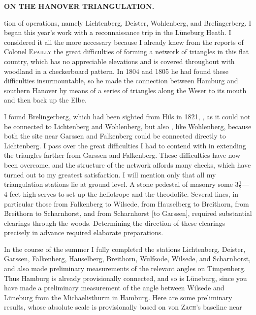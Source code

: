 \par\clearpage
\noindent{}\hfill{\small\textbf{ON THE HANOVER TRIANGULATION.}}\hfill\null\par\medskip
\noindent tion of operations, namely Lichtenberg, Deister, Wohlenberg, and Brelingerberg. I began this year's work with a reconnaissance trip in the Lüneburg Heath. I considered it all the more necessary because I already knew from the reports of Colonel \textsc{Epailly} the great difficulties of forming a network of triangles in this flat country, which has no appreciable elevations and is covered throughout with woodland in a checkerboard pattern. In 1804 and 1805 he had found these difficulties insurmountable, so he made the connection between Hamburg and southern Hanover by means of a series of triangles along the Weser to its mouth and then back up the Elbe.
\par\noindent\hspace*{\parindent}I found Brelingerberg, which had been sighted from Hils in 1821, , as it could not be connected to Lichtenberg and Wohlenberg, but also , like Wohlenberg, because both the site near Garssen and Falkenberg could be connected directly to Lichtenberg. I pass over the great difficulties I had to contend with in extending the triangles farther from Garssen and Falkenberg. These difficulties have now been overcome, and the structure of the network affords many checks, which have turned out to my greatest satisfaction. I will mention only that all my triangulation stations lie at ground level. A stone pedestal of masonry some \(3\frac{1}{2}\)---4 feet high serves to set up the heliotrope and the theodolite. Several lines, in particular those from Falkenberg to Wilsede, from Hauselberg to Breithorn, from Breithorn to Scharnhorst, and from Scharnhorst [to Garssen], required substantial clearings through the woods. Determining the direction of these clearings precisely in advance required elaborate preparations.
\par\noindent\hspace*{\parindent}In the course of the summer I fully completed the stations Lichtenberg, Deister, Garssen, Falkenberg, Hauselberg, Breithorn, Wulfsode, Wilsede, and Scharnhorst, and also made preliminary measurements of the relevant angles on Timpenberg. Thus Hamburg is already provisionally connected, and so is Lüneburg, since you have made a preliminary measurement of the angle between Wilsede and Lüneburg from the Michaelisthurm in Hamburg. Here are some preliminary results, whose absolute scale is provisionally based on von \textsc{Zach}'s baseline near

